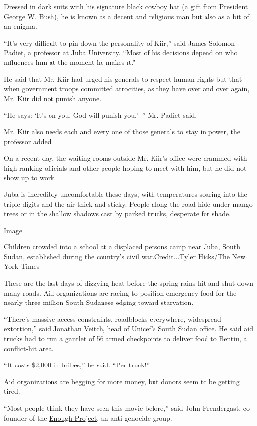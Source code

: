 Dressed in dark suits with his signature black cowboy hat (a gift from
President George W. Bush), he is known as a decent and religious man but
also as a bit of an enigma.

``It's very difficult to pin down the personality of Kiir,'' said James
Solomon Padiet, a professor at Juba University. ``Most of his decisions
depend on who influences him at the moment he makes it.''

He said that Mr. Kiir had urged his generals to respect human rights but
that when government troops committed atrocities, as they have over and
over again, Mr. Kiir did not punish anyone.

``He says: `It's on you. God will punish you,'~'' Mr. Padiet said.

Mr. Kiir also needs each and every one of those generals to stay in
power, the professor added.

On a recent day, the waiting rooms outside Mr. Kiir's office were
crammed with high-ranking officials and other people hoping to meet with
him, but he did not show up to work.

Juba is incredibly uncomfortable these days, with temperatures soaring
into the triple digits and the air thick and sticky. People along the
road hide under mango trees or in the shallow shadows cast by parked
trucks, desperate for shade.

Image

Children crowded into a school at a displaced persons camp near Juba,
South Sudan, established during the country's civil war.Credit...Tyler
Hicks/The New York Times

These are the last days of dizzying heat before the spring rains hit and
shut down many roads. Aid organizations are racing to position emergency
food for the nearly three million South Sudanese edging toward
starvation.

``There's massive access constraints, roadblocks everywhere, widespread
extortion,'' said Jonathan Veitch, head of Unicef's South Sudan office.
He said aid trucks had to run a gantlet of 56 armed checkpoints to
deliver food to Bentiu, a conflict-hit area.

``It costs \$2,000 in bribes,'' he said. ``Per truck!''

Aid organizations are begging for more money, but donors seem to be
getting tired.

``Most people think they have seen this movie before,'' said John
Prendergast, co-founder of the
\href{http://www.enoughproject.org/}{Enough Project}, an anti-genocide
group.

